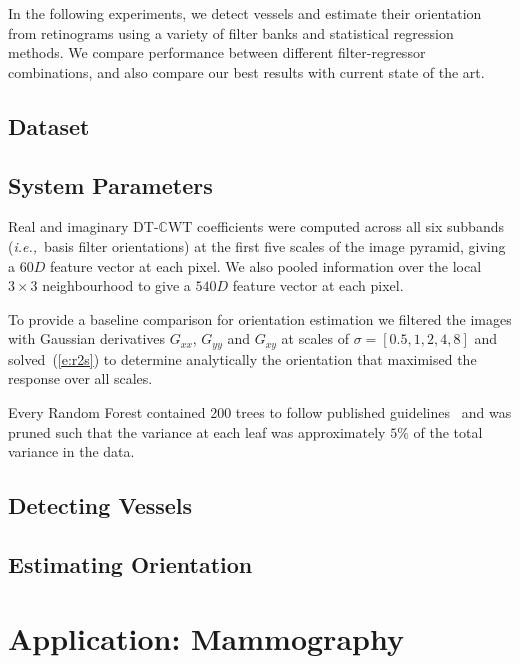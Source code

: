 \documentclass{IEEEtran}
\def\ie{\emph{i.e.,}}
\newcommand{\eref}[1]{(\ref{#1})}
\def\Gxx{G_{xx}}
\def\Gxy{G_{xy}} \def\Gyx{G_{yx}}
\def\Gyy{G_{yy}}
\def\dtcwt{DT-$\mathbb{C}$WT}
\def\by{\ensuremath{\times}}
\begin{document}
\label{s:exp_retinogram}
In the following experiments, we detect vessels and estimate their orientation from retinograms using a variety of filter banks and statistical regression methods. We compare performance between different filter-regressor combinations, and also compare our best results with current state of the art.

\subsection{Dataset}


\subsection{System Parameters}
Real and imaginary \dtcwt{} coefficients were computed across all six subbands (\ie~basis filter orientations) at the first five scales of the image pyramid, giving a $60D$ feature vector at each pixel. We also pooled information over the local $3 \by 3$ neighbourhood to give a $540D$ feature vector at each pixel.

To provide a baseline comparison for orientation estimation we filtered the images with Gaussian derivatives $\Gxx$, $\Gyy$ and $\Gxy$ at scales of $\sigma{=}[0.5, 1, 2, 4, 8]$ and solved~\eref{e:r2s} to determine analytically the orientation that maximised the response over all scales. 

Every Random Forest contained 200 trees to follow published guidelines~\cite{Breiman_ML01} and was pruned such that the variance at each leaf was approximately $5\%$ of the total variance in the data.

\subsection{Detecting Vessels}


\subsection{Estimating Orientation}



\clearpage
\section{Application: Mammography}

\end{document}

